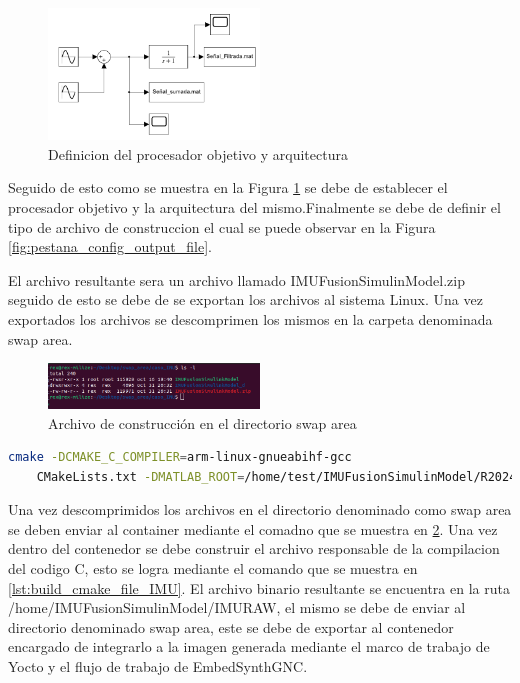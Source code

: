 \begin{figure}[h!]
    \centering
    \includegraphics[width=0.5\textwidth]{fig/especifico_2/CASO_ESTUDIO_FILTRO/Diagrama matlab simulink scope.pdf}
    \caption{Definicion del procesador objetivo y arquitectura}
    \label{fig:system_target_IMU}
\end{figure}

Seguido de esto como se muestra en la Figura \ref{fig:system_target_IMU} se debe de establecer el procesador objetivo y la arquitectura del mismo.Finalmente se debe de definir el tipo de archivo de construccion el cual se puede observar en la Figura \ref{fig:pestana_config_output_file}. 

El archivo resultante sera un archivo llamado IMUFusionSimulinModel.zip seguido de esto se debe de  se exportan los archivos al sistema Linux. Una vez exportados los archivos se descomprimen los mismos en la carpeta denominada swap area.

\begin{figure}[h!]
    \centering
    \includegraphics[width=0.5\textwidth]{fig/Capitulo5/Caso_de_estudio_IMU/retornos_consola/Screenshot from 2024-10-31 20-33-27.png}
    \caption{Archivo de construcción en el directorio swap area}
    \label{fig:swap_area_imu}
\end{figure}

\begin{lstlisting}[language=bash, caption={Compilacion del programa , Linux}, label=lst:build_cmake_file_IMU]
    cmake -DCMAKE_C_COMPILER=arm-linux-gnueabihf-gcc 
    CMakeLists.txt -DMATLAB_ROOT=/home/test/IMUFusionSimulinModel/R2024b/
\end{lstlisting}

Una vez descomprimidos los archivos en el directorio denominado como swap area se deben enviar al container mediante el comadno que se muestra en \ref{fig:swap_area_imu}. Una vez dentro del contenedor se debe construir el archivo responsable de la compilacion del codigo C, esto se logra mediante el comando que se muestra en \ref{lst:build_cmake_file_IMU}. El archivo binario resultante se encuentra en la ruta /home/IMUFusionSimulinModel/IMURAW, el mismo se debe de enviar al directorio denominado swap area, este se debe de exportar al contenedor encargado de integrarlo a la imagen generada mediante el marco de trabajo de Yocto y el flujo de trabajo de EmbedSynthGNC. 


